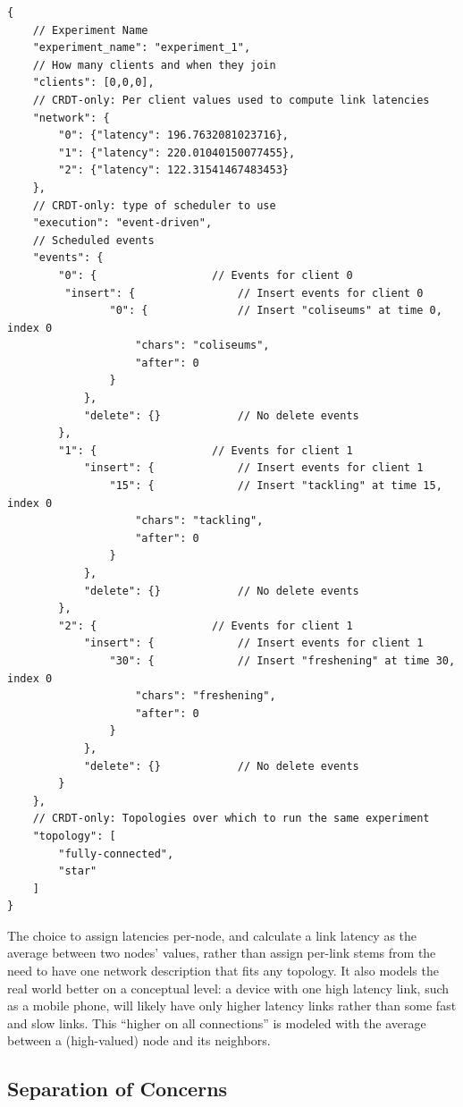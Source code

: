 \documentclass[12pt,a4paper,twoside,openright]{report}
\begin{document}
\begin{lstlisting}[caption={A simple JSON experiment setup. Comments added for explanation and not part of JSON syntax}, label={lst:simple}]
{
	// Experiment Name
    "experiment_name": "experiment_1", 	
	// How many clients and when they join
    "clients": [0,0,0],		
	// CRDT-only: Per client values used to compute link latencies	
    "network": {				
        "0": {"latency": 196.7632081023716}, 
        "1": {"latency": 220.01040150077455}, 
        "2": {"latency": 122.31541467483453}
    },
	// CRDT-only: type of scheduler to use
    "execution": "event-driven", 	
	// Scheduled events
    "events": {						
        "0": {					// Events for client 0
         "insert": {				// Insert events for client 0
                "0": {				// Insert "coliseums" at time 0, index 0
                    "chars": "coliseums", 
                    "after": 0
                }
            }, 
            "delete": {}			// No delete events
        }, 
        "1": {					// Events for client 1
            "insert": {				// Insert events for client 1
                "15": {				// Insert "tackling" at time 15, index 0
                    "chars": "tackling", 		
                    "after": 0
                }
            }, 
            "delete": {}			// No delete events
        }, 
        "2": {					// Events for client 1
            "insert": {				// Insert events for client 1
                "30": {				// Insert "freshening" at time 30, index 0
                    "chars": "freshening", 
                    "after": 0
                }
            }, 
            "delete": {}			// No delete events
        }
	},
	// CRDT-only: Topologies over which to run the same experiment
    "topology": [					
        "fully-connected", 
        "star"
    ]
}
\end{lstlisting}

	The choice to assign latencies per-node, and calculate a link latency as the average between two nodes' values, rather than assign per-link stems from the need to have one network description that fits any topology. It also models the real world better on a conceptual level: a device with one high latency link, such as a mobile phone, will likely have only higher latency links rather than some fast and slow links. This ``higher on all connections'' is modeled with the average between a (high-valued) node and its neighbors.

	
	\subsection{Separation of Concerns}
	
\end{document}
